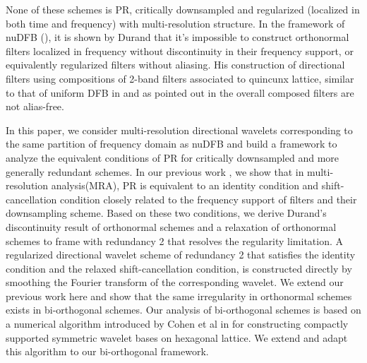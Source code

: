 None of these schemes is PR, critically downsampled and regularized (localized in both time and frequency) with multi-resolution structure. 
In the framework of nuDFB (\cite{nuDFB05}), it is shown by Durand \cite{durand2007} that it's impossible to construct orthonormal filters localized in frequency without discontinuity in their frequency support, or equivalently regularized filters without aliasing. His construction of directional filters using compositions of 2-band filters associated to quincunx lattice, similar to that of uniform DFB in \cite{nuDFB05} and as pointed out in \cite{nuDFB05} the overall composed filters are not alias-free.

In this paper, we consider multi-resolution directional wavelets corresponding to the same partition of frequency domain as nuDFB and build a framework to analyze the equivalent conditions of PR for critically downsampled and more generally redundant schemes. In our previous work \cite{yin2014orthshear}, we show that in multi-resolution analysis(MRA), PR is equivalent to an identity condition and shift-cancellation condition closely related to the frequency support of filters and their downsampling scheme. Based on these two conditions, we derive Durand's discontinuity result of orthonormal schemes and a relaxation of orthonormal schemes to frame with redundancy 2 that resolves the regularity limitation. A regularized directional wavelet scheme of redundancy 2 that satisfies the identity condition and the relaxed shift-cancellation condition, is constructed directly by smoothing the Fourier transform of the corresponding wavelet.
We extend our previous work here and show that the same irregularity in orthonormal schemes exists in bi-orthogonal schemes. Our analysis of bi-orthogonal schemes is based on a numerical algorithm introduced by Cohen et al in \cite{cohen1993compactly} for constructing compactly supported symmetric wavelet bases on hexagonal lattice. We extend and adapt this algorithm to our bi-orthogonal framework.

